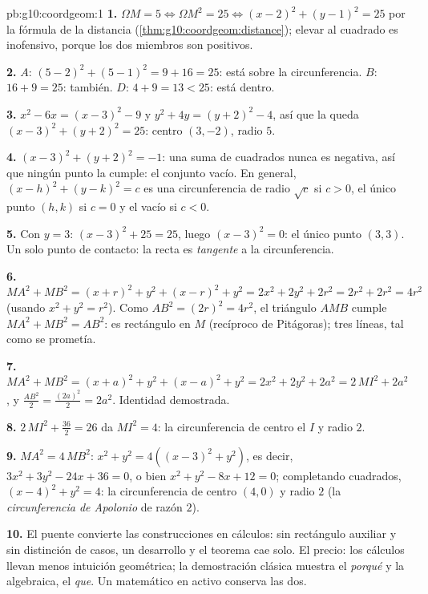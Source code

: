 \begin{solution}{pb:g10:coordgeom:1}
\textbf{1.} $\Omega M = 5 \iff \Omega M^2 = 25 \iff
(x - 2)^2 + (y - 1)^2 = 25$ por la fórmula de la distancia
(\cref{thm:g10:coordgeom:distance}); elevar al cuadrado es inofensivo,
porque los dos miembros son positivos.

\textbf{2.} $A$: $(5-2)^2 + (5-1)^2 = 9 + 16 = 25$: está sobre la
circunferencia. $B$: $16 + 9 = 25$: también. $D$: $4 + 9 = 13 < 25$: está
dentro.

\textbf{3.} $x^2 - 6x = (x - 3)^2 - 9$ y $y^2 + 4y = (y + 2)^2 - 4$, así
que la  queda $(x - 3)^2 + (y + 2)^2 = 25$: centro $(3, -2)$,
radio $5$.

\textbf{4.} $(x - 3)^2 + (y + 2)^2 = -1$: una suma de cuadrados nunca es
negativa, así que ningún punto la cumple: el conjunto vacío. En general,
$(x - h)^2 + (y - k)^2 = c$ es una circunferencia de radio $\sqrt c$ si
$c > 0$, el único punto $(h, k)$ si $c = 0$ y el vacío si $c < 0$.

\textbf{5.} Con $y = 3$: $(x - 3)^2 + 25 = 25$, luego $(x - 3)^2 = 0$: el
único punto $(3, 3)$. Un solo punto de contacto: la recta es
\emph{tangente} a la circunferencia.

\textbf{6.} $MA^2 + MB^2 = (x + r)^2 + y^2 + (x - r)^2 + y^2
= 2x^2 + 2y^2 + 2r^2 = 2r^2 + 2r^2 = 4r^2$ (usando $x^2 + y^2 = r^2$).
Como $AB^2 = (2r)^2 = 4r^2$, el triángulo $AMB$ cumple
$MA^2 + MB^2 = AB^2$: es rectángulo en $M$ (recíproco de Pitágoras); tres
líneas, tal como se prometía.

\textbf{7.} $MA^2 + MB^2 = (x + a)^2 + y^2 + (x - a)^2 + y^2
= 2x^2 + 2y^2 + 2a^2 = 2\,MI^2 + 2a^2$, y
$\frac{AB^2}{2} = \frac{(2a)^2}{2} = 2a^2$. Identidad demostrada.

\textbf{8.} $2\,MI^2 + \frac{36}{2} = 26$ da $MI^2 = 4$: la circunferencia
de centro el  $I$ y radio $2$.

\textbf{9.} $MA^2 = 4\,MB^2$:
$x^2 + y^2 = 4\left((x - 3)^2 + y^2\right)$, es decir,
$3x^2 + 3y^2 - 24x + 36 = 0$, o bien $x^2 + y^2 - 8x + 12 = 0$;
completando cuadrados, $(x - 4)^2 + y^2 = 4$: la circunferencia de centro
$(4, 0)$ y radio $2$ (la \emph{circunferencia de Apolonio} de razón $2$).

\textbf{10.} El puente convierte las construcciones en cálculos: sin
rectángulo auxiliar y sin distinción de casos, un desarrollo y el teorema
cae solo. El precio: los cálculos llevan menos intuición geométrica; la
demostración clásica muestra el \emph{porqué} y la algebraica, el
\emph{que}. Un matemático en activo conserva las dos.


\end{solution}
